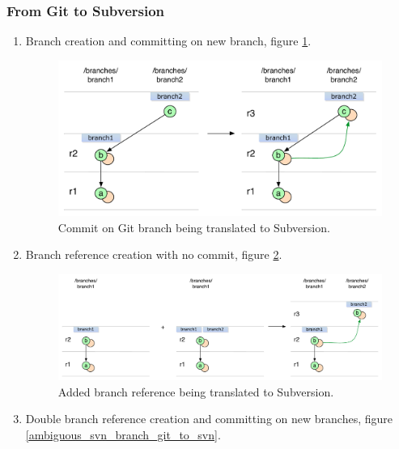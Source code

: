 \subsubsection{From Git to Subversion}

\begin{enumerate}
\compactlist
\item Branch creation and committing on new branch, figure \ref{branch_creation_git_to_svn}.

\begin{figure}[h]
\centering
\includegraphics[width=\linewidth]{img/diagrams/branch_creation_git_to_svn.pdf}
\caption{Commit on Git branch being translated to Subversion.}
\label{branch_creation_git_to_svn}
\end{figure}

\item Branch reference creation with no commit, figure \ref{svn_no_change_branch_creation_git_to_svn}.

\begin{figure}[h]
\centering
\includegraphics[width=\linewidth]{img/diagrams/svn_no_change_branch_creation_git_to_svn.pdf}
\caption{Added branch reference being translated to Subversion.}
\label{svn_no_change_branch_creation_git_to_svn}
\end{figure}

\item Double branch reference creation and committing on new branches, figure \ref{ambiguous_svn_branch_git_to_svn}.


\end{enumerate}
